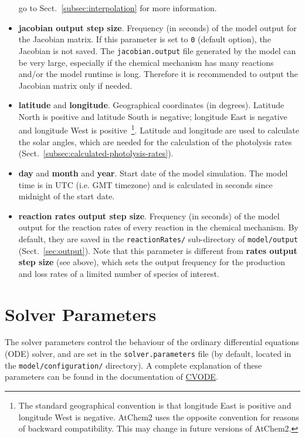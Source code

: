 \begin{itemize}
  go to Sect.~\ref{subsec:interpolation} for more information.
\item \textbf{jacobian output step size}. Frequency (in seconds) of
  the model output for the Jacobian matrix. If this parameter is set
  to \texttt{0} (default option), the Jacobian is not saved. The
  \texttt{jacobian.output} file generated by the model can be very
  large, especially if the chemical mechanism has many reactions
  and/or the model runtime is long. Therefore it is recommended to
  output the Jacobian matrix only if needed.
\item \textbf{latitude} and \textbf{longitude}. Geographical
  coordinates (in degrees). Latitude North is positive and latitude
  South is negative; longitude East is negative and longitude West is
  positive~\footnote{The standard geographical convention is that
    longitude East is positive and longitude West is negative. AtChem2
    uses the opposite convention for reasons of backward
    compatibility. This may change in future versions of
    AtChem2.}. Latitude and longitude are used to calculate the solar
  angles, which are needed for the calculation of the photolysis rates
  (Sect.~\ref{subsec:calculated-photolysis-rates}).
\item \textbf{day} and \textbf{month} and \textbf{year}. Start date of
  the model simulation. The model time is in UTC (i.e. GMT timezone)
  and is calculated in seconds since midnight of the start date.
\item \textbf{reaction rates output step size}. Frequency (in seconds)
  of the model output for the reaction rates of every reaction in the
  chemical mechanism. By default, they are saved in the
  \texttt{reactionRates/} sub-directory of \texttt{model/output}
  (Sect.~\ref{sec:output}). Note that this parameter is different from
  \textbf{rates output step size} (see above), which sets the output
  frequency for the production and loss rates of a limited number of
  species of interest.
\end{itemize}

\section{Solver Parameters} \label{sec:solver-parameters}

The solver parameters control the behaviour of the ordinary
differential equations (ODE) solver, and are set in the
\texttt{solver.parameters} file (by default, located in the
\texttt{model/configuration/} directory). A complete explanation of
these parameters can be found in the documentation of
\href{https://computing.llnl.gov/projects/sundials/cvode}{CVODE}.

